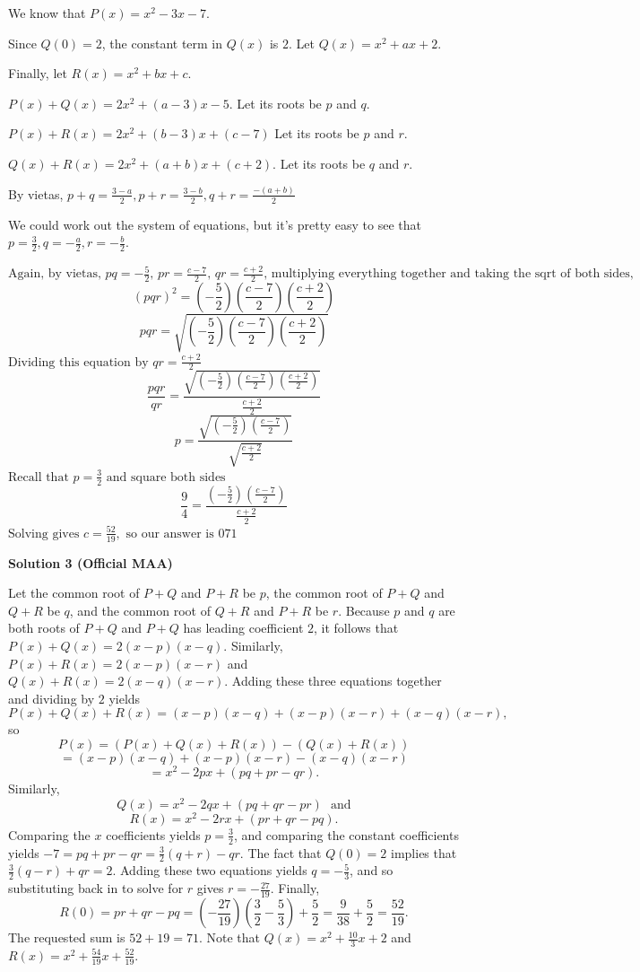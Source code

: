 \begin{enumerate}
We know that $P(x)=x^2-3x-7$. 

 Since $Q(0)=2$, the constant term in $Q(x)$ is $2$. Let $Q(x)=x^2+ax+2$. 

 Finally, let $R(x)=x^2+bx+c$.

 $P(x)+Q(x)=2x^2+(a-3)x-5$. Let its roots be $p$ and $q$.

 $P(x)+R(x)=2x^2+(b-3)x+(c-7)$ Let its roots be $p$ and $r$.

 $Q(x)+R(x)=2x^2+(a+b)x+(c+2)$. Let its roots be $q$ and $r$.

 By vietas, $p+q=\frac{3-a}{2}, p+r=\frac{3-b}{2}, q+r=\frac{-(a+b)}{2}$

 We could work out the system of equations, but it's pretty easy to see that $p=\frac32, q=-\frac{a}{2}, r=-\frac{b}{2}$.

 $\text{Again, by vietas, }pq=-\frac52\text{, } pr=\frac{c-7}{2}\text{, } qr=\frac{c+2}{2}\text{, } \text{multiplying everything together a}\text{nd taking the sqrt of both sides,}$
 \[(pqr)^2=\left(-\frac52\right)\left(\frac{c-7}{2}\right)\left(\frac{c+2}{2}\right)\]
 \[pqr=\sqrt{\left(-\frac52\right)\left(\frac{c-7}{2}\right)\left(\frac{c+2}{2}\right)}\]$\text{Dividing this }\text{equation by }qr=\frac{c+2}{2}$
 \[\frac{pqr}{qr}=\frac{\sqrt{\left(-\frac52\right)\left(\frac{c-7}{2}\right)\left(\frac{c+2}{2}\right)}}{\frac{c+2}{2}}\]
 \[p = \frac{\sqrt{\left(-\frac52\right)\left(\frac{c-7}{2}\right)}}{\sqrt{\frac{c+2}{2}}}\]$\text{Recall th}\text{at }p=\frac32 \text{ and square both sides}$
 \[\frac94=\frac{\left(-\frac52\right)\left(\frac{c-7}{2}\right)}{\frac{c+2}{2}}\]$\text{Solving gives } c=\frac{52}{19}, \text{ so our answer is }\boxed{071}$




\textbf{Solution 3 (Official MAA)}

Let the common root of $P+Q$ and $P+R$ be $p$, the common root of $P+Q$ and $Q+R$ be $q$, and the common root of $Q+R$ and $P+R$ be $r$. Because $p$ and $q$ are both roots of $P+Q$ and $P+Q$ has leading coefficient $2$, it follows that $P(x) + Q(x) = 2(x-p)(x-q).$ Similarly, $P(x) + R(x) = 2(x-p)(x-r)$ and $Q(x) + R(x) = 2(x-q)(x-r)$. Adding these three equations together and dividing by $2$ yields
 \[P(x) + Q(x) + R(x) = (x-p)(x-q) + (x-p)(x-r) + (x-q)(x-r),\]so
 \[P(x) = (P(x) + Q(x) + R(x)) - (Q(x) + R(x))\]
 \[= (x-p)(x-q) + (x-p)(x-r) - (x-q)(x-r)\]
 \[= x^2 - 2px + (pq + pr - qr).\]Similarly,
 \[Q(x) =  x^2 - 2qx + (pq + qr - pr) \text{~ and}\]
 \[R(x) =  x^2 - 2rx + (pr + qr - pq).\]Comparing the $x$ coefficients yields $p = \frac32$, and comparing the constant coefficients yields $-7 = pq + pr - qr = \frac32(q+r) - qr$. The fact that $Q(0) = 2$ implies that $\frac32(q-r) + qr = 2$. Adding these two equations yields $q = -\frac53$, and so substituting back in to solve for $r$ gives $r=-\frac{27}{19}$. Finally,
 \[R(0) = pr + qr - pq = \left(-\frac{27}{19}\right)\left(\frac32-\frac53\right) + \frac52 = \frac{9}{38} + \frac52 = \frac{52}{19}.\]The requested sum is $52 + 19 = 71$. Note that $Q(x) = x^2 + \frac{10}3x + 2$ and $R(x) = x^2 + \frac{54}{19}x + \frac{52}{19}$.


\end{enumerate}
